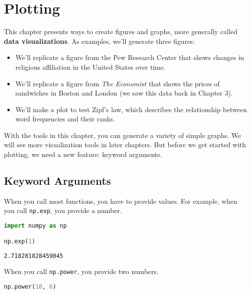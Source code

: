 \chapter{Plotting}\label{plotting}

This chapter presents ways to create figures and graphs, more generally
called \textbf{data visualizations}. As examples, we'll generate three
figures:

\begin{itemize}
\item
  We'll replicate a figure from the Pew Research Center that shows
  changes in religious affiliation in the United States over time.
\item
  We'll replicate a figure from \emph{The Economist} that shows the
  prices of sandwiches in Boston and London (we saw this data back in
  Chapter 3).
\item
  We'll make a plot to test Zipf's law, which describes the relationship
  between word frequencies and their ranks.
\end{itemize}

With the tools in this chapter, you can generate a variety of simple
graphs. We will see more visualization tools in later chapters. But
before we get started with plotting, we need a new feature: keyword
arguments.

\section{Keyword Arguments}\label{keyword-arguments}

When you call most functions, you have to provide values. For example,
when you call \passthrough{\lstinline!np.exp!}, you provide a number.

\begin{lstlisting}[language=Python,style=source]
import numpy as np

np.exp(1)
\end{lstlisting}

\begin{lstlisting}[style=output]
2.718281828459045
\end{lstlisting}

\pagebreak

When you call \passthrough{\lstinline!np.power!}, you provide two
numbers.

\begin{lstlisting}[language=Python,style=source]
np.power(10, 6)
\end{lstlisting}

